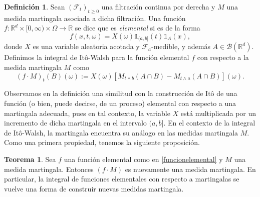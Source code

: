\documentclass[letterpaper,twoside,12pt]{book}
\newcommand{\R}{\mathbb{R}}
\newcommand{\F}{\mathcal{F}}
\newcommand{\B}{\mathcal{B}}
\newcommand{\1}{\mathds{1}}
\renewcommand{\to}{\rightarrow}
\theoremstyle{definition}
\newtheorem{dfn}{Definición}
\theoremstyle{definition}
\newtheorem{teo}{Teorema}
\theoremstyle{remark}
\theoremstyle{definition}
\theoremstyle{definition}
\theoremstyle{definition}
\theoremstyle{definition}
\theoremstyle{definition}
\begin{document}
\begin{dfn}
Sean $(\F_t)_{t\geq0}$ una filtración continua por derecha y $M$ una medida martingala asociada a dicha filtración. Una función $f:\R^{d}\times [0,\infty)\times \Omega\to \R$ se dice que es \textit{elemental} si es de la forma 
\begin{equation}\label{funcionelemental}
      f(x,t,\omega)=X(\omega)\1_{(a,b]}(t)\1_A(x),
\end{equation}
donde $X$ es una variable aleatoria acotada y $\F_a$-medible, y además $A\in \B(\R^{d})$. Definimos la integral de Itô-Walsh para la función elemental $f$ con respecto a la medida martingala $M$ como
\[
(f\cdot M)_t(B)(\omega):= X(\omega)\left[M_{t\wedge b}(A\cap B)-M_{t\wedge a}(A\cap B)\right](\omega).
\]
\end{dfn}
Observamos en la definición una similitud con la construcción de Itô de una función (o bien, puede decirse, de un proceso) elemental con respecto a una martingala adecuada, pues en tal contexto, la variable $X$ está multiplicada por un incremento de dicha martingala en el intervalo $(a,b]$. En el contexto de la integral de Itô-Walsh, la martingala encuentra su análogo en las medidas martingala $M$. Como una primera propiedad, tenemos la siguiente proposición.
\begin{teo} 
Sea $f$ una función elemental como en \eqref{funcionelemental} y $M$ una medida martingala. Entonces $(f\cdot M)$ es nuevamente una medida martingala. En particular, la integral de funciones elementales con respecto a martingalas se vuelve una forma de construir nuevas medidas martingala.
\end{teo}
\end{document}
